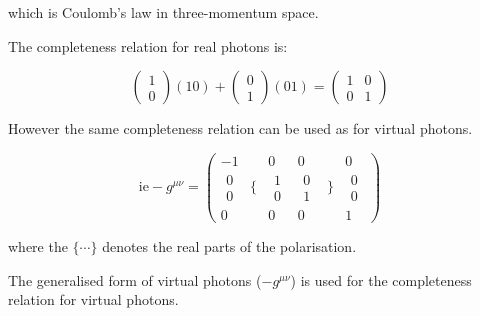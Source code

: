 which is Coulomb's law in three-momentum space.

The completeness relation for real photons is:

\[
  \left(
    \begin{array}{c}
    1 \\
    0
    \end{array}
  \right)
  \left(1 0\right)
  +
  \left(
    \begin{array}{c}
    0 \\
    1
    \end{array}
  \right)
  \left(0 1\right)
  =
  \left(
    \begin{array}{cc}
    1 & 0 \\
    0 & 1
    \end{array}
  \right)
\]

However the same completeness relation can be used as for virtual photons.

\[
  \textrm{ie} -g^{\mu\nu} = 
  \left(
    \begin{array}{cccccc}
    -1 & & 0 & 0 & & 0 \\
      \begin{array}{c}
      0 \\
      0
      \end{array}
    &
    \Bigg\{
    &
      \begin{array}{c}
      1 \\
      0
      \end{array}
    &
      \begin{array}{c}
      0 \\
      1
      \end{array}
    &
    \Bigg\}
    &
      \begin{array}{c}
      0 \\
      0
      \end{array}
    \\
    0 & & 0 & 0 & & 1
    \end{array}
  \right)
\]

where the $\{ \cdots \}$ denotes the real parts of the polarisation.

The generalised form of virtual photons ($-g^{\mu\nu}$) is used for the completeness relation for virtual photons.
